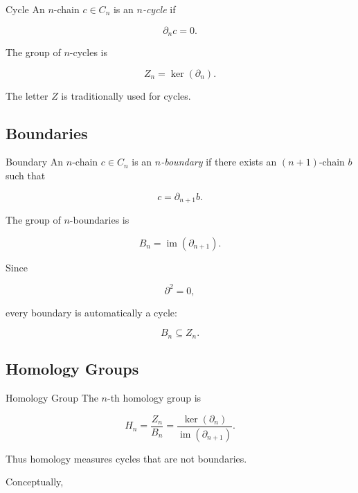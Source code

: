 \begin{definitionbox}{Cycle}
An \(n\)-chain \(c\in C_n\) is an \emph{\(n\)-cycle} if

\[
\boxed{
\partial_n c=0.
}
\]
\end{definitionbox}

The group of \(n\)-cycles is

\[
\boxed{
Z_n
=
\ker(\partial_n).
}
\]

The letter \(Z\) is traditionally used for cycles.

\subsection{Boundaries}
\label{subsec:homological-boundaries}

\begin{definitionbox}{Boundary}
An \(n\)-chain \(c\in C_n\) is an \emph{\(n\)-boundary} if there exists an
\((n+1)\)-chain \(b\) such that

\[
\boxed{
c=\partial_{n+1}b.
}
\]
\end{definitionbox}

The group of \(n\)-boundaries is

\[
\boxed{
B_n
=
\operatorname{im}(\partial_{n+1}).
}
\]

Since

\[
\partial^2=0,
\]

every boundary is automatically a cycle:

\[
\boxed{
B_n\subseteq Z_n.
}
\]

\subsection{Homology Groups}
\label{subsec:homology-groups}

\begin{definitionbox}{Homology Group}
The \(n\)-th homology group is

\[
\boxed{
H_n
=
\frac{Z_n}{B_n}
=
\frac{
\ker(\partial_n)
}{
\operatorname{im}(\partial_{n+1})
}.
}
\]
\end{definitionbox}

Thus homology measures cycles that are not boundaries.

Conceptually,

